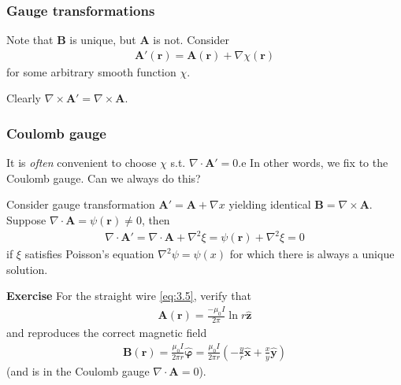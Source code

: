 \documentclass[a4paper]{article}
\begin{document}
\subsubsection{Gauge transformations}
Note that $\mathbf{B}$ is unique, but $\mathbf{A}$ is not. Consider
\begin{equation*}\tag{3.13} \label{eq:3.13}
\begin{aligned}
\mathbf{A}'(\mathbf{r}) = \mathbf{A}(\mathbf{r}) + \nabla \chi(\mathbf{r})
\end{aligned}
\end{equation*}
for some arbitrary smooth function $\chi$.

Clearly $\nabla \times \mathbf{A}' = \nabla \times \mathbf{A}$.

\subsubsection{Coulomb gauge}
It is \emph{often} convenient to choose $\chi$ s.t. $\nabla \cdot \mathbf{A}' = 0$.e In other words, we fix to the Coulomb gauge. Can we always do this?

Consider gauge transformation $\mathbf{A}' = \mathbf{A} + \nabla x$ yielding identical $\mathbf{B} = \nabla \times \mathbf{A}$. Suppose $\nabla \cdot \mathbf{A} = \psi(\mathbf{r}) \neq 0$, then
\begin{equation*}
\begin{aligned}
\nabla \cdot \mathbf{A'} = \nabla \cdot \mathbf{A} + \nabla^2 \xi = \psi (\mathbf{r}) + \nabla^2 \xi = 0
\end{aligned}
\end{equation*}
if $\xi$ satisfies Poisson's equation $\nabla^2 \psi = \psi(x)$ for which there is always a unique solution.

\textbf{Exercise} For the straight wire \eqref{eq:3.5}, verify that
\begin{equation*}
\begin{aligned}
\mathbf{A}(\mathbf{r}) = \frac{-\mu_0 I}{2\pi} \ln r \hat{\mathbf{z}}
\end{aligned}
\end{equation*}
and reproduces the correct magnetic field
\begin{equation*}
\begin{aligned}
\mathbf{B}(\mathbf{r}) = \frac{\mu_0 I}{2\pi r} \hat{\mathbf{\varphi}} = \frac{\mu_0I}{2\pi r} \left(-\frac{y}{r} \hat{\mathbf{x}} + \frac{x}{y}\hat{\mathbf{y}}\right)
\end{aligned}
\end{equation*}
(and is in the Coulomb gauge $\nabla \cdot \mathbf{A} = 0$).
\end{document}
